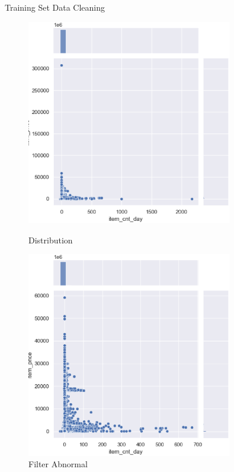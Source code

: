 \documentclass[
 size=14pt,
 paper=smartboard,  %
 mode=present, 		%
 display=slides, 	%
 style=tuliplab,  	%
 pauseslide,
 fleqn,leqno]{powerdot}
\begin{document}
\begin{slide}[toc=,bm=]{Training Set Data Cleaning}
\begin{figure}[htbp]
  \centering
  \begin{minipage}[t]{0.48\textwidth}
    \centering
    \includegraphics[width=0.8\textwidth]{logos/filter1.eps}
    \vspace{0.4em}
    \caption{Distribution}
  \end{minipage}
  \begin{minipage}[t]{0.48\textwidth}
    \centering
    \includegraphics[width=0.8\textwidth]{logos/3.2.2.eps}
    \vspace{0.4em}
    \caption{Filter Abnormal}
  \end{minipage}
\end{figure}



\end{slide}
\end{document}
